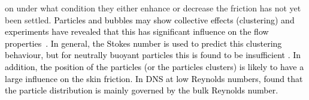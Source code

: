 \documentclass{jfm}
\newcommand{\red}[1]{\textcolor{black}{#1}}
\begin{document}
on under what condition they either enhance or decrease the friction has not
yet been settled.  \red{Particles and bubbles may show collective effects
    (clustering) and experiments have revealed that this has significant
    influence on the flow properties~\citep{Liu1993, Kulick1994, Muste1997,
    So2002, Fujiwara2004, vandenBerg2005, vandenBerg2007, Shawkat2008,
Calzavarini2008, Colin2012, vanGils2013, Maryami2014, Mathai2015,
Almeras2017,mathai2018enhanced}. In general, the Stokes number is used to
predict this clustering behaviour, but for neutrally buoyant particles this is
found to be insufficient \citep{Bragg2015,Fiabane2012}. In addition, the
position of the particles (or the particles clusters) is likely to have a
large influence on the skin friction.  In DNS at low Reynolds numbers,
\cite{Kazerooni2017} found that the particle distribution is mainly governed
by the bulk Reynolds number.}
\end{document}
